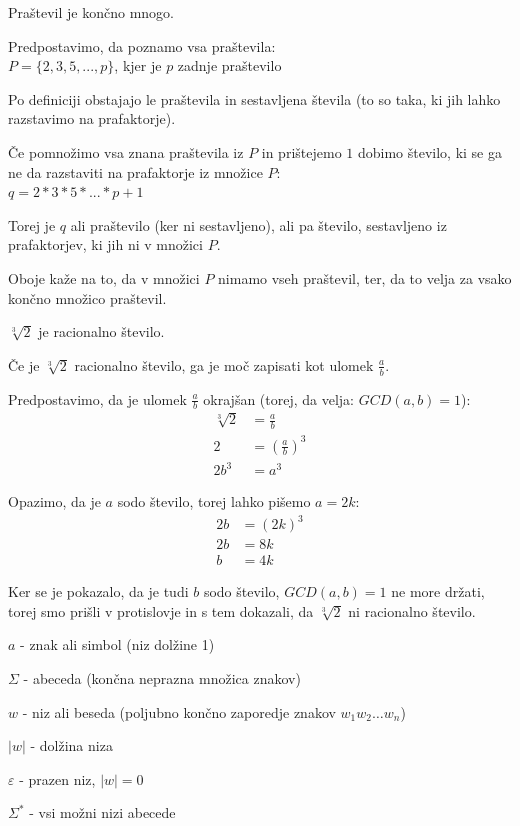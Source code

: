 \documentclass[10pt,a4paper,oneside]{book}
\begin{document}
\begin{primeri}
\item Praštevil je končno mnogo.
	\begin{items}
	\item Predpostavimo, da poznamo vsa praštevila:\\
		$P = \{2,3,5,...,p\}$, kjer je $p$ zadnje praštevilo 
	\item Po definiciji obstajajo le praštevila in sestavljena števila (to so taka, ki jih lahko razstavimo na prafaktorje). 
	\item Če pomnožimo vsa znana praštevila iz $P$ in prištejemo $1$ dobimo število, ki se ga ne da razstaviti na prafaktorje iz množice $P$:\\
		$q = 2 * 3 * 5 * ... * p + 1$
	\item Torej je $q$ ali praštevilo (ker ni sestavljeno), ali pa število, sestavljeno iz prafaktorjev, ki jih ni v množici $P$.
	\item Oboje kaže na to, da v množici $P$ nimamo vseh praštevil, ter, da to velja za vsako končno množico praštevil.
	\end{items}
\item $\sqrt[3]{2}$ je racionalno število.
	\begin{items}
	\item Če je $\sqrt[3]{2}$ racionalno število, ga je moč zapisati kot ulomek $\frac{a}{b}$.
	\item Predpostavimo, da je ulomek $\frac{a}{b}$ okrajšan (torej, da velja: $GCD(a,b)=1$):
		\begin{align*}
		\sqrt[3]{2} &= \frac{a}{b}\\
		2 &= \left( \frac{a}{b} \right)^3\\
		2b^3 &= a^3
		\end{align*}
	\item Opazimo, da je $a$ sodo število, torej lahko pišemo $a = 2k$:
		\begin{align*}
		2b &= \left( 2k\right)^3\\
		2b &= 8k\\
		b &= 4k
		\end{align*}
	\item Ker se je pokazalo, da je tudi $b$ sodo število, $GCD(a,b)=1$ ne more držati, torej smo prišli v protislovje in s tem dokazali, da $\sqrt[3]{2}$ ni racionalno število.
	\end{items}
\end{primeri}
\begin{items}
\item $a$ - znak ali simbol (niz dolžine 1)
\item $\Sigma$ - abeceda (končna neprazna množica znakov)
\item $w$ - niz ali beseda (poljubno končno zaporedje znakov $w_1w_2 \ldots w_n$)
\item $|w|$ - dolžina niza
\item $\varepsilon$ - prazen niz, $|w|=0$
\item $\Sigma^*$ - vsi možni nizi abecede
\end{items}
\end{document}
